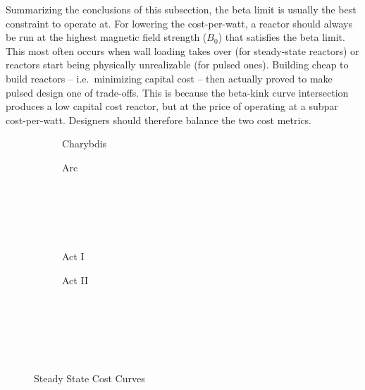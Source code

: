 Summarizing the conclusions of this subsection, the beta limit is usually the best constraint to operate at. For lowering the cost-per-watt, a reactor should always be run at the highest magnetic field strength ($B_0$) that satisfies the beta limit. This most often occurs when wall loading takes over (for steady-state reactors) or reactors start being physically unrealizable (for pulsed ones). Building cheap to build reactors -- i.e.\ minimizing capital cost -- then actually proved to make pulsed design one of trade-offs. This is because the beta-kink curve intersection produces a low capital cost reactor, but at the price of operating at a subpar cost-per-watt. Designers should therefore balance the two cost metrics.

\clearpage

\newpage

\begin{figure*}
    \centering
    \hfill 
    \begin{subfigure}[t]{0.45\textwidth}
        \centering
		\begin{adjustbox}{width=\textwidth}
			\Large
			
		\end{adjustbox}
        \caption{Charybdis}
    \end{subfigure}
    \hfill
    \begin{subfigure}[t]{0.45\textwidth}
        \centering
		\begin{adjustbox}{width=\textwidth}
			\Large
			
		\end{adjustbox}
        \caption{Arc}
    \end{subfigure}
    \hfill \hfill ~\\ ~\\ ~\\ ~\\
    \hfill 
    \begin{subfigure}[t]{0.45\textwidth}
        \centering
		\begin{adjustbox}{width=\textwidth}
			\Large
			
		\end{adjustbox}
        \caption{Act I}
    \end{subfigure}
    \hfill
    \begin{subfigure}[t]{0.45\textwidth}
        \centering
		\begin{adjustbox}{width=\textwidth}
			\Large
			
		\end{adjustbox}
        \caption{Act II}
    \end{subfigure}
    \hfill \hfill ~\\ ~\\ ~\\
    \caption{Steady State Cost Curves}
    \label{fig:steady_cost} ~ \\
\end{figure*}

